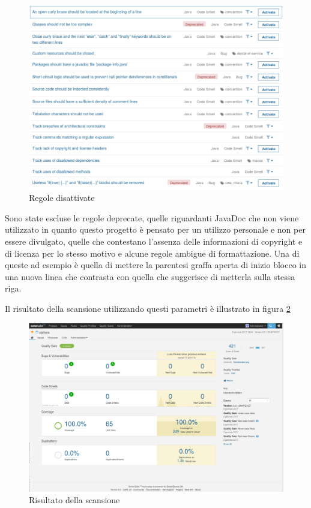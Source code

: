 		\begin{figure}
			\includegraphics[scale=0.4]{img/sonarqube_rules}
			\caption{Regole disattivate}
			\label{fig:sonarules}
		\end{figure}
		
		Sono state escluse le regole deprecate, quelle riguardanti JavaDoc che non viene utilizzato in quanto questo progetto è pensato per un utilizzo personale e non per essere divulgato, quelle che contestano l'assenza delle informazioni di copyright e di licenza per lo stesso motivo e alcune regole ambigue di formattazione. Una di queste ad esempio è quella di mettere la parentesi graffa aperta di inizio blocco in una nuova linea che contrasta con quella che suggerisce di metterla sulla stessa riga.
		
		Il risultato della scansione utilizzando questi parametri è illustrato in figura \ref{fig:sonaresult}
		
		\begin{figure}
			\includegraphics[scale=0.3]{img/sonaresult}
			\caption{Risultato della scansione}
			\label{fig:sonaresult}
		\end{figure}